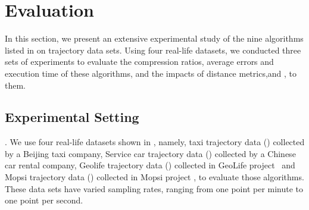 \section{Evaluation} %
\label{sec-exp}
In this section, we present an extensive experimental study of the nine \lsa algorithms listed in  on trajectory data sets.
Using four real-life datasets, we conducted three sets of experiments to evaluate the compression ratios, average errors and execution time of these algorithms, and the impacts of distance metrics,\ie \sed and \ped, to them.


\vspace{-1ex}
\subsection{Experimental Setting}

.
We use four real-life datasets shown in , namely, taxi trajectory data (\taxi) collected by a Beijing taxi company, Service car trajectory data (\ucar) collected by a Chinese car rental company, Geolife trajectory data (\geolife) collected in GeoLife project~\cite{Web:Geolife} and Mopsi trajectory data (\mopsi) collected in Mopsi project \cite{Web:Mopsi}, to evaluate those \lsa algorithms. These data sets have varied sampling rates, ranging from one point per minute to one point per second.

